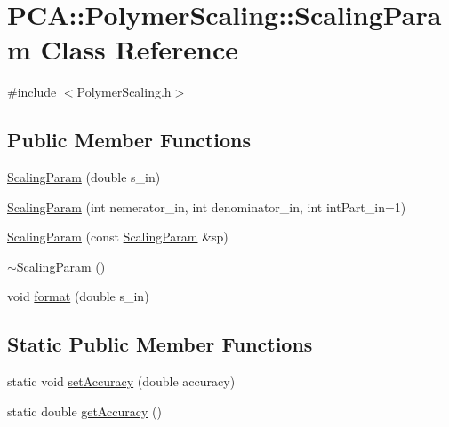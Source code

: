 \hypertarget{class_p_c_a_1_1_polymer_scaling_1_1_scaling_param}{}\section{P\+CA\+:\+:Polymer\+Scaling\+:\+:Scaling\+Param Class Reference}
\label{class_p_c_a_1_1_polymer_scaling_1_1_scaling_param}


{\ttfamily \#include $<$Polymer\+Scaling.\+h$>$}

\subsection*{Public Member Functions}
\begin{DoxyCompactItemize}
\item 
\hyperlink{class_p_c_a_1_1_polymer_scaling_1_1_scaling_param_ab7be79e64f74cafbac672e659925b8e2}{Scaling\+Param} (double s\+\_\+in)
\item 
\hyperlink{class_p_c_a_1_1_polymer_scaling_1_1_scaling_param_a5654edc034cd78f007fd29f2b3bf0755}{Scaling\+Param} (int nemerator\+\_\+in, int denominator\+\_\+in, int int\+Part\+\_\+in=1)
\item 
\hyperlink{class_p_c_a_1_1_polymer_scaling_1_1_scaling_param_a4ee55749c642eb9e62595513dcde57bf}{Scaling\+Param} (const \hyperlink{class_p_c_a_1_1_polymer_scaling_1_1_scaling_param}{Scaling\+Param} \&sp)
\item 
\hyperlink{class_p_c_a_1_1_polymer_scaling_1_1_scaling_param_a4e1f7212533f55877bb1edb12655e4b1}{$\sim$\+Scaling\+Param} ()
\item 
void \hyperlink{class_p_c_a_1_1_polymer_scaling_1_1_scaling_param_a981e9bd9307e657fe02832ea5c4154fa}{format} (double s\+\_\+in)
\end{DoxyCompactItemize}
\subsection*{Static Public Member Functions}
\begin{DoxyCompactItemize}
\item 
static void \hyperlink{class_p_c_a_1_1_polymer_scaling_1_1_scaling_param_adba9217facd6feba2b8477743416f32a}{set\+Accuracy} (double accuracy)
\item 
static double \hyperlink{class_p_c_a_1_1_polymer_scaling_1_1_scaling_param_a6967872a0025d89438b4bb68b1c680bc}{get\+Accuracy} ()
\end{DoxyCompactItemize}
